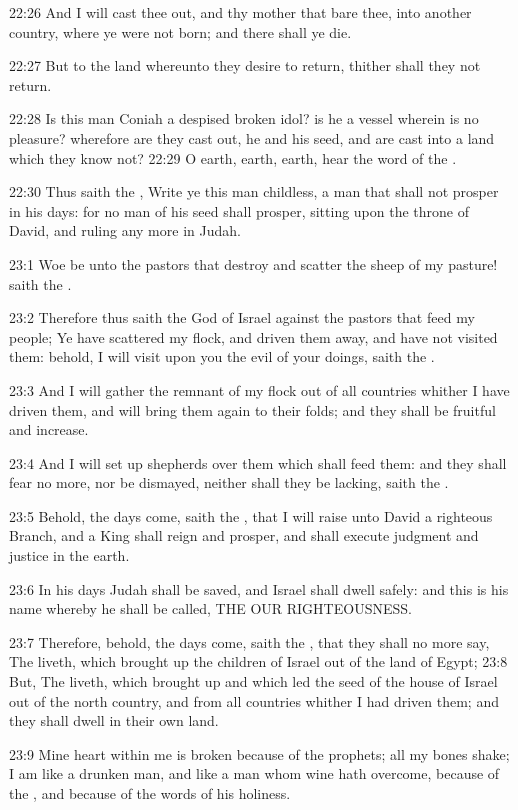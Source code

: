 22:26 And I will cast thee out, and thy mother that bare thee, into another country, where ye were not born; and there shall ye die.

22:27 But to the land whereunto they desire to return, thither shall they not return.

22:28 Is this man Coniah a despised broken idol? is he a vessel wherein is no pleasure? wherefore are they cast out, he and his seed, and are cast into a land which they know not?  22:29 O earth, earth, earth, hear the word of the \LORD.

22:30 Thus saith the \LORD, Write ye this man childless, a man that shall not prosper in his days: for no man of his seed shall prosper, sitting upon the throne of David, and ruling any more in Judah.

23:1 Woe be unto the pastors that destroy and scatter the sheep of my pasture! saith the \LORD.

23:2 Therefore thus saith the \LORD God of Israel against the pastors that feed my people; Ye have scattered my flock, and driven them away, and have not visited them: behold, I will visit upon you the evil of your doings, saith the \LORD.

23:3 And I will gather the remnant of my flock out of all countries whither I have driven them, and will bring them again to their folds; and they shall be fruitful and increase.

23:4 And I will set up shepherds over them which shall feed them: and they shall fear no more, nor be dismayed, neither shall they be lacking, saith the \LORD.

23:5 Behold, the days come, saith the \LORD, that I will raise unto David a righteous Branch, and a King shall reign and prosper, and shall execute judgment and justice in the earth.

23:6 In his days Judah shall be saved, and Israel shall dwell safely: and this is his name whereby he shall be called, THE \LORD OUR RIGHTEOUSNESS.

23:7 Therefore, behold, the days come, saith the \LORD, that they shall no more say, The \LORD liveth, which brought up the children of Israel out of the land of Egypt; 23:8 But, The \LORD liveth, which brought up and which led the seed of the house of Israel out of the north country, and from all countries whither I had driven them; and they shall dwell in their own land.

23:9 Mine heart within me is broken because of the prophets; all my bones shake; I am like a drunken man, and like a man whom wine hath overcome, because of the \LORD, and because of the words of his holiness.

